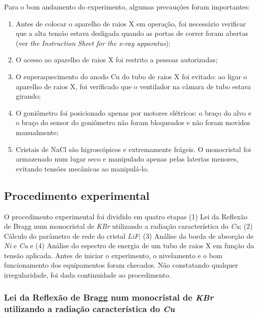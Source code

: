 \documentclass[article,12pt,openright,oneside,a4paper,brazil]{abntex2}
\begin{document}
        Para o bom andamento do experimento, algumas precauções foram importantes: 
            \renewcommand{\labelenumi}{\roman{enumi}}
                \begin{enumerate}
                    \item  Antes de colocar o aparelho de raios X em operação, foi necessário verificar que a alta tensão estava desligada quando as portas de correr foram abertas (ver \textit{the Instruction Sheet for the x-ray apparatus});
                    \item O acesso ao aparelho de raios X foi restrito a pessoas autorizadas;
                    \item O superaquecimento do anodo Cu do tubo de raios X foi evitado: ao ligar o aparelho de raios X, foi verificado que o ventilador na câmara de tubo estava girando;
                    \item O goniômetro foi posicionado apenas por motores elétricos: o braço do alvo e o braço do sensor do goniômetro não foram bloqueados e não foram movidos manualmente;
                    \item Cristais de NaCl são higroscópicos e extremamente frágeis. O monocristal foi armazenado num lugar seco e manipulado apenas pelas laterias menores, evitando tensões mecânicas ao manipulá-lo.
                \end{enumerate}
                
    \subsection{Procedimento experimental}
        
        O procedimento experimental foi dividido em quatro etapas (1) Lei da Reflexão de Bragg num monocristal de \textit{KBr} utilizando a radiação característica do \textit{Cu}; (2) Cálculo do parâmetro de rede do cristal \textit{LiF}; (3) Análise da borda de absorção de \textit{Ni} e \textit{Cu} e (4) Análise do espectro de energia de um tubo de raios X em função da tensão aplicada. Antes de iniciar o experimento, o nivelamento e o bom funcionamento dos equipamentos foram checados. Não constatando qualquer irregularidade, foi dada  continuidade ao procedimento.
        
            \subsubsection{ Lei da Reflexão de Bragg num monocristal de \textit{KBr} utilizando a radiação característica do \textit{Cu} }
                
\end{document}
